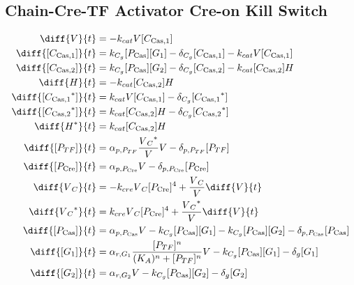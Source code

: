 \subsection{Chain-Cre-TF Activator Cre-on Kill Switch}
\label{s:Chain_Cre_TF_Activator_Cre_on_Kill_Switch}

\begin{align}
\diff{\vectorGen{}}{t} & = - \casCutRate{{}}\vectorGen{}\conc{\cplx{\cas}{1}}\\
\diff{\conc{\cplx{\cas}{1}}}{t} & =  \gRnaBind{}\conc{\proSp{\cas{}}}\conc{\gRna{1}} - \casCompDegradeRate{}\conc{\cplx{\cas}{1}} - \casCutRate{{}}\vectorGen{}\conc{\cplx{\cas}{1}}\\
\diff{\conc{\cplx{\cas}{2}}}{t} & =  \gRnaBind{}\conc{\proSp{\cas{}}}\conc{\gRna{2}} - \casCompDegradeRate{}\conc{\cplx{\cas}{2}} - \casCutRate{{}}\conc{\cplx{\cas}{2}}\hostGen{}\\
\diff{\hostGen{}}{t} & = - \casCutRate{{}}\conc{\cplx{\cas}{2}}\hostGen{}\\
\diff{\conc{\bound{\cplx{\cas}{1}}}}{t} & =  \casCutRate{{}}\vectorGen{}\conc{\cplx{\cas}{1}} - \casCompDegradeRate{}\conc{\bound{\cplx{\cas}{1}}}\\
\diff{\conc{\bound{\cplx{\cas}{2}}}}{t} & =  \casCutRate{{}}\conc{\cplx{\cas}{2}}\hostGen{} - \casCompDegradeRate{}\conc{\bound{\cplx{\cas}{2}}}\\
\diff{\edited{\hostGen{}}}{t} & =  \casCutRate{{}}\conc{\cplx{\cas}{2}}\hostGen{}\\
\diff{\conc{\proSp{TF}}}{t} & =  \txtlRate{\proSp{TF}}\frac{\edited{\vectorGen{}_C}}{\vectorGen{}}\vectorGen{} - \proDegradeRate{\proSp{TF}}\conc{\proSp{TF}}\\
\diff{\conc{\proSp{\cre{}}}}{t} & =  \txtlRate{\proSp{\cre{}}}\vectorGen{} - \proDegradeRate{\proSp{\cre{}}}\conc{\proSp{\cre{}}}\\
\diff{\vectorGen{}_C}{t} & = - \creCutRate{} \vectorGen{}_C \conc{\proSp{\cre{}}}^4 + \frac{\vectorGen{}_C}{\vectorGen{}} \diff{\vectorGen{}}{t}\\
\diff{\edited{\vectorGen{}_C}}{t} & =  \creCutRate{} \vectorGen{}_C \conc{\proSp{\cre{}}}^4 + \frac{\edited{\vectorGen{}_C}}{\vectorGen{}} \diff{\vectorGen{}}{t}\\
\diff{\conc{\proSp{\cas{}}}}{t} & =  \txtlRate{\proSp{\cas{}}}\vectorGen{} - \gRnaBind{}\conc{\proSp{\cas{}}}\conc{\gRna{1}} - \gRnaBind{}\conc{\proSp{\cas{}}}\conc{\gRna{2}} - \proDegradeRate{\proSp{\cas{}}}\conc{\proSp{\cas{}}}\\
\diff{\conc{\gRna{1}}}{t} & =  \txRate{\gRna{1}}\frac{\conc{\proSp{TF}}^n}{(K_A)^n + \conc{\proSp{TF}}^n}\vectorGen{} - \gRnaBind{}\conc{\proSp{\cas{}}}\conc{\gRna{1}} - \rnaDegradeRate{}\conc{\gRna{1}}\\
\diff{\conc{\gRna{2}}}{t} & =  \txRate{\gRna{2}}\vectorGen{} - \gRnaBind{}\conc{\proSp{\cas{}}}\conc{\gRna{2}} - \rnaDegradeRate{}\conc{\gRna{2}}
\end{align}

